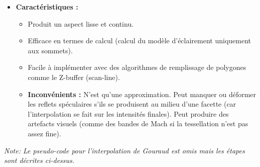 \documentclass{article}
\begin{document}
\begin{itemize}
\begin{enumerate}
\begin{itemize}
                \end{itemize}
        \end{enumerate}
    \item \textbf{Caractéristiques :}
        \begin{itemize}
            \item Produit un aspect lisse et continu.
            \item Efficace en termes de calcul (calcul du modèle d'éclairement uniquement aux sommets).
            \item Facile à implémenter avec des algorithmes de remplissage de polygones comme le Z-buffer (scan-line).
            \item \textbf{Inconvénients :} N'est qu'une approximation. Peut manquer ou déformer les reflets spéculaires s'ils se produisent au milieu d'une facette (car l'interpolation se fait sur les intensités finales). Peut produire des artefacts visuels (comme des bandes de Mach si la tessellation n'est pas assez fine).
        \end{itemize}
\end{itemize}

\textit{Note: Le pseudo-code pour l'interpolation de Gouraud est omis mais les étapes sont décrites ci-dessus.}
\end{document}
